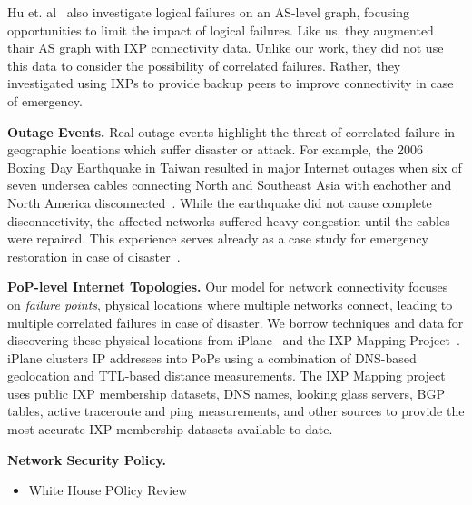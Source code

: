     Hu et. al~\cite{ixp-routingdiversity} also investigate logical failures on an AS-level graph, focusing opportunities to limit the impact of logical failures.
    Like us, they augmented thair AS graph with IXP connectivity data.
    Unlike our work, they did not use this data to consider the possibility of correlated failures.
    Rather, they investigated using IXPs to provide backup peers to improve connectivity in case of emergency. 

{\bf Outage Events.}
    Real outage events highlight the threat of correlated failure in geographic locations which suffer disaster or attack.
    For example, the 2006 Boxing Day Earthquake in Taiwan resulted in major Internet outages when six of seven undersea cables connecting North and Southeast Asia with eachother and North America disconnected~\cite{asia-comm-quake}. 
    While the earthquake did not cause complete disconnectivity, the affected networks suffered heavy congestion until the cables were repaired.
    This experience serves already as a case study for emergency restoration in case of disaster~\cite{taiwan}. 
        



{\bf PoP-level Internet Topologies.}
    Our model for network connectivity focuses on {\it failure points}, physical locations where multiple networks connect, leading to multiple correlated failures in case of disaster.
    We borrow techniques and data for discovering these physical locations from iPlane~\cite{iplane} and the IXP Mapping Project~\cite{ixps-mapped}.
    iPlane clusters IP addresses into PoPs using a combination of DNS-based geolocation and TTL-based distance measurements.
    The IXP Mapping project uses public IXP membership datasets, DNS names, looking glass servers, BGP tables, active traceroute and ping measurements, and other sources to provide the most accurate IXP membership datasets available to date. 

{\bf Network Security Policy.}
    \begin{itemize}
        \item White House POlicy Review~\cite{cyberspacepolicy} 
    \end{itemize}
